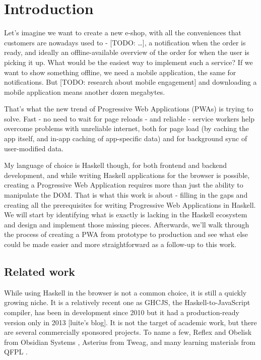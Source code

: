 \documentclass[english,odsaz]{fitthesis}
\date{\today}
\title{}
\begin{document}
\maketitle
\setlength{\parskip}{0pt}
{\hypersetup{hidelinks}\tableofcontents}
\iftotalfigures\listoffigures\fi
\iftotaltables\listoftables\fi
\iftwoside\cleardoublepage\fi
\setlength{\parskip}{0.5\bigskipamount}

\chapter{Introduction}
\label{sec:orga37ebcc}
Let's imagine we want to create a new e-shop, with all the conveniences that
customers are nowadays used to - [TODO: \ldots{}], a notification when the order is
ready, and ideally an offline-available overview of the order for when the user
is picking it up. What would be the easiest way to implement such a service? If
we want to show something offline, we need a mobile application, the same for
notifications. But [TODO: research about mobile engagement] and downloading a
mobile application means another dozen megabytes.

That's what the new trend of Progressive Web Applications (PWAs) is trying to
solve. Fast - no need to wait for page reloads - and reliable - service workers help
overcome problems with unreliable internet, both for page load (by caching the
app itself, and in-app caching of app-specific data) and for background sync of
user-modified data.

My language of choice is Haskell though, for both frontend and backend
development, and while writing Haskell applications for the browser is possible,
creating a Progressive Web Application requires more than just the ability to
manipulate the DOM. That is what this work is about - filling in the gaps and
creating all the prerequisites for writing Progressive Web Applications in
Haskell. We will start by identifying what is exactly is lacking in the Haskell
ecosystem and design and implement those missing pieces. Afterwards, we'll walk
through the process of creating a PWA from prototype to production and see what
else could be made easier and more straightforward as a follow-up to this work.

\section{Related work}
\label{sec:org9157415}
While using Haskell in the browser is not a common choice, it is still a quickly
growing niche. It is a relatively recent one as GHCJS, the Haskell-to-JavaScript
compiler, has been in development since 2010 \cite{ghcjs} but it had a
production-ready version only in 2013 [luite's blog]. It is not the target of
academic work, but there are several commercially sponsored projects. To name a
few, Reflex and Obelisk from Obsidian Systems \cite{obsidian}, Asterius from Tweag,
and many learning materials from QFPL \cite{qfpl}.
\end{document}
